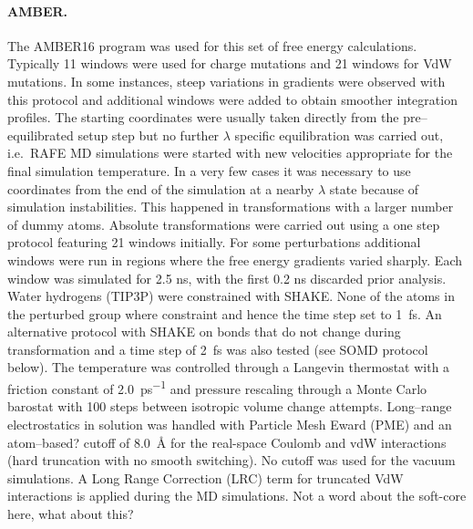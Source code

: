 \documentclass[journal=jctcce,manuscript=article]{achemso}
\begin{document}
\paragraph{AMBER.} 
The AMBER16 program was used for this set of free energy calculations.  
%
Typically 11 windows were used for charge mutations and 21 windows for VdW mutations. 
In some instances, steep variations in gradients were observed with this protocol and additional windows were added to obtain smoother integration profiles. 
The starting coordinates were usually taken directly from the pre--equilibrated setup step but no further $\lambda$ specific equilibration  was carried out, 
i.e.\ RAFE MD simulations were started with new velocities appropriate for the final simulation temperature.  
In a very few cases it was necessary to use coordinates from the end of the simulation at a nearby $\lambda$ state because of simulation instabilities. 
This happened in transformations with a larger number of dummy atoms.  
Absolute transformations were carried out using a one step protocol featuring 21 windows initially. 
For some perturbations additional windows were run in regions where the free energy gradients varied sharply. 
Each window was simulated for 2.5 ns, with the first 0.2 ns discarded prior analysis.
%
Water hydrogens (TIP3P) were constrained with SHAKE. 
None of the atoms in the perturbed group where constraint and hence the time step set to \SI{1}{fs}.  
An alternative protocol with SHAKE on bonds that do not change during transformation and a time step of \SI{2}{fs} was also tested (see SOMD protocol below). 
%
The temperature was controlled through a Langevin thermostat with a friction constant of \SI{2.0}{ps^{-1}} and pressure 
rescaling through a Monte Carlo barostat with 100 steps between isotropic volume change attempts.  
%
Long--range electrostatics in solution was handled with Particle Mesh Eward (PME) and an {\color{red} atom--based? } cutoff 
of \SI{8.0}{\angstrom} for the real-space Coulomb and vdW interactions {\color{red} (hard truncation with no smooth switching)}.
No cutoff was used for the vacuum simulations. 
%
A Long Range Correction (LRC) term for truncated VdW interactions is applied during the MD simulations. 
%
{\color{red} Not a word about the soft-core here, what about this? }
\end{document}
